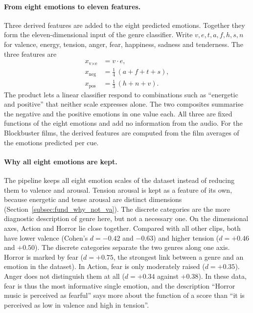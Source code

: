 \paragraph{From eight emotions to eleven features.} Three derived features are added to the eight predicted emotions. Together they form the eleven-dimensional input of the genre classifier. Write $v, e, t, a, f, h, s, n$ for valence, energy, tension, anger, fear, happiness, sadness and tenderness. The three features are
\begin{align}
  x_{\text{v}\times\text{e}} &= v \cdot e, \\
  x_{\text{neg}} &= \tfrac{1}{4}\,(a + f + t + s), \\
  x_{\text{pos}} &= \tfrac{1}{3}\,(h + n + v).
\end{align}
The product lets a linear classifier respond to combinations such as ``energetic and positive'' that neither scale expresses alone. The two composites summarise the negative and the positive emotions in one value each. All three are fixed functions of the eight emotions and add no information from the audio. For the Blockbuster films, the derived features are computed from the film averages of the emotions predicted per cue.

\paragraph{Why all eight emotions are kept.}
\label{par:methods_eight}
The pipeline keeps all eight emotion scales of the dataset instead of reducing them to valence and arousal. Tension arousal is kept as a feature of its own, because energetic and tense arousal are distinct dimensions (Section~\ref{subsec:fund_why_not_va}). The discrete categories are the more diagnostic description of genre here, but not a necessary one. On the dimensional axes, Action and Horror lie close together. Compared with all other clips, both have lower valence (Cohen's $d = -0.42$ and $-0.63$) and higher tension ($d = +0.46$ and $+0.50$). The discrete categories separate the two genres along one axis. Horror is marked by fear ($d = +0.75$, the strongest link between a genre and an emotion in the dataset). In Action, fear is only moderately raised ($d = +0.35$). Anger does not distinguish them at all ($d = +0.34$ against $+0.38$). In these data, fear is thus the most informative single emotion, and the description ``Horror music is perceived as fearful'' says more about the function of a score than ``it is perceived as low in valence and high in tension''.

